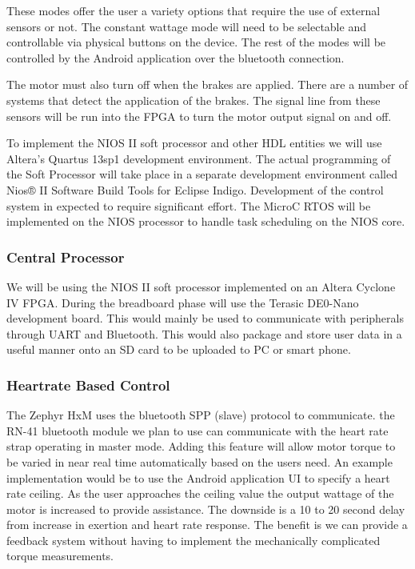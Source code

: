 \documentclass[12pt,article]{IEEEtran}
\begin{document}
        These modes offer the user a variety options that require the use of external sensors or not. The constant
        wattage mode will need to be selectable and controllable via physical buttons on the device. The rest of the
        modes will be controlled by the Android application over the bluetooth connection.
        
        The motor must also turn off when the brakes are applied. There are a number of systems that detect the application
        of the brakes. The signal line from these sensors will be run into the FPGA to turn the motor output signal on and off. 
        
        To implement the NIOS II soft processor and other HDL entities  we will use Altera’s Quartus 13sp1 development
        environment. The actual programming of the Soft Processor will take place in a separate development environment called
        Nios® II Software Build Tools for Eclipse Indigo. Development of the control system in expected to require significant 
        effort. The MicroC RTOS will be implemented on the NIOS processor to handle task scheduling on the NIOS core. 

    \subsubsection{Central Processor}
        We will be using the NIOS II soft processor implemented on an Altera Cyclone IV FPGA. During
        the breadboard phase will use the Terasic DE0-Nano development board. This would mainly be 
        used to communicate with peripherals through UART and Bluetooth. This would also package and 
        store user data in a useful manner onto an SD card to be uploaded to PC or smart phone. 
    
    \subsubsection{Heartrate Based Control}
        The Zephyr HxM uses the bluetooth SPP (slave) protocol to communicate. the RN-41 bluetooth module 
        we plan to use can communicate with the heart rate strap operating  in master mode. Adding this feature 
        will allow motor torque to be varied in near real time automatically based on the users need. An example 
        implementation would be to use the Android application UI to specify a heart rate ceiling. As the user approaches 
        the ceiling value the output wattage of the motor is increased to provide assistance. The downside 
        is a 10 to 20 second delay from increase in exertion and heart rate response. The benefit is we can 
        provide a feedback system without having to implement the mechanically complicated torque measurements. \cite{HxMAPI}
\end{document}
